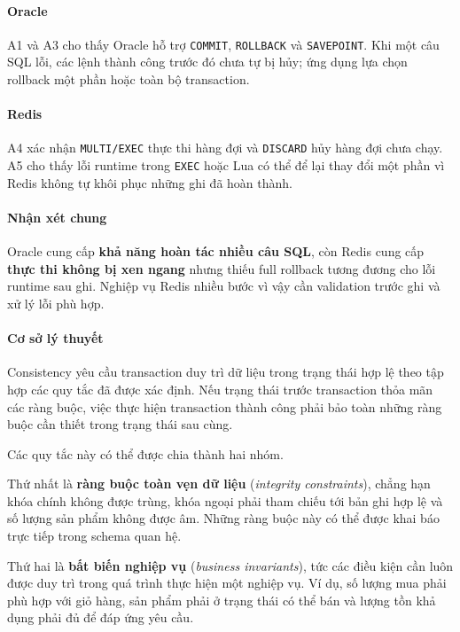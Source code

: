 \paragraph*{Oracle}

A1 và A3 cho thấy Oracle hỗ trợ \texttt{COMMIT}, \texttt{ROLLBACK} và \texttt{SAVEPOINT}. Khi một câu SQL lỗi, các lệnh thành công trước đó chưa tự bị hủy; ứng dụng lựa chọn rollback một phần hoặc toàn bộ transaction.

\paragraph*{Redis}

A4 xác nhận \texttt{MULTI/\allowbreak{}EXEC} thực thi hàng đợi và \texttt{DISCARD} hủy hàng đợi chưa chạy. A5 cho thấy lỗi runtime trong \texttt{EXEC} hoặc Lua có thể để lại thay đổi một phần vì Redis không tự khôi phục những ghi đã hoàn thành.

\paragraph*{Nhận xét chung}

Oracle cung cấp \textbf{khả năng hoàn tác nhiều câu SQL}, còn Redis cung cấp \textbf{thực thi không bị xen ngang} nhưng thiếu full rollback tương đương cho lỗi runtime sau ghi. Nghiệp vụ Redis nhiều bước vì vậy cần validation trước ghi và xử lý lỗi phù hợp.

\label{sec:tx-2-2}
\paragraph*{Cơ sở lý thuyết}

Consistency yêu cầu transaction duy trì dữ liệu trong trạng thái hợp lệ theo tập hợp các quy tắc đã được xác định. Nếu trạng thái trước transaction thỏa mãn các ràng buộc, việc thực hiện transaction thành công phải bảo toàn những ràng buộc cần thiết trong trạng thái sau cùng.

Các quy tắc này có thể được chia thành hai nhóm.

Thứ nhất là \textbf{ràng buộc toàn vẹn dữ liệu} (\emph{integrity constraints}), chẳng hạn khóa chính không được trùng, khóa ngoại phải tham chiếu tới bản ghi hợp lệ và số lượng sản phẩm không được âm. Những ràng buộc này có thể được khai báo trực tiếp trong schema quan hệ.

Thứ hai là \textbf{bất biến nghiệp vụ} (\emph{business invariants}), tức các điều kiện cần luôn được duy trì trong quá trình thực hiện một nghiệp vụ. Ví dụ, số lượng mua phải phù hợp với giỏ hàng, sản phẩm phải ở trạng thái có thể bán và lượng tồn khả dụng phải đủ để đáp ứng yêu cầu.

